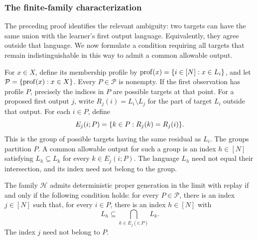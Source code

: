 \subsubsection{The finite-family characterization}

The preceding proof identifies the relevant ambiguity: two targets can
have the same union with the learner's first output language. Equivalently,
they agree outside that language. We now formulate a condition requiring
all targets that remain indistinguishable in this way to admit a common
allowable output.

For $x\in X$, define its membership profile by
$\operatorname{prof}(x)=\{i\in[N]:x\in L_i\}$, and let
$\mathcal P=\{\operatorname{prof}(x):x\in X\}$.
Every $P\in\mathcal P$ is nonempty. If the first observation has profile
$P$, precisely the indices in $P$ are possible targets at that point.
For a proposed first output $j$, write
$R_j(i)=L_i\setminus L_j$ for the part of target $L_i$ outside that
output. For each $i\in P$, define
\[
 E_j(i;P)=\{k\in P:R_j(k)=R_j(i)\}.
\]
This is the group of possible targets having the same residual as $L_i$.
The groups partition $P$. A common allowable output for such a group
is an index $h\in[N]$ satisfying $L_h\subseteq L_k$ for every
$k\in E_j(i;P)$. The language $L_h$ need not equal their intersection,
and its index need not belong to the group.

\begin{suppthm}
\label{app:replay:thm:main}
The family $\mathcal H$ admits deterministic proper generation in the
limit with replay if and only if the following condition holds:
for every $P\in\mathcal P$, there is an index $j\in[N]$ such that,
for every $i\in P$, there is an index $h\in[N]$ with
\[
 L_h\subseteq\bigcap_{k\in E_j(i;P)}L_k.
\]
The index $j$ need not belong to $P$.
\end{suppthm}

